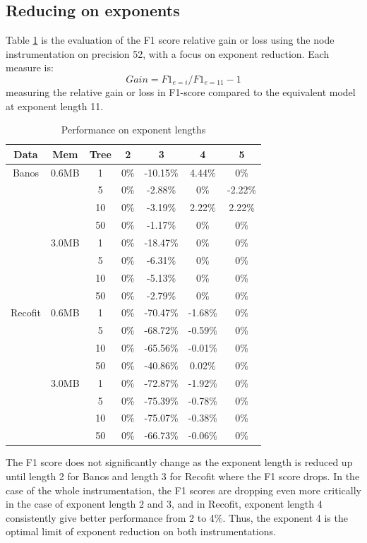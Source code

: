 \documentclass[conference]{IEEEtran}
\begin{document}
\subsection{Reducing on exponents}
Table \ref{tab3} is the evaluation of the F1 score relative gain or loss using the node instrumentation on precision 52, with a focus on exponent reduction. Each measure is:
\begin{equation}
Gain = F1_{e=i} / F1_{e=11}-1 \label{eq2}
\end{equation}
measuring the relative gain or loss in F1-score compared to the equivalent model at exponent length 11.
\begin{table}[htbp]
\caption{Performance on exponent lengths}
\begin{center}
\begin{tabular}{|c|c|c|c|c|c|c|}
\hline
\textbf{Data}&\textbf{Mem}&\textbf{Tree}&\textbf{2}&\textbf{3}&\textbf{4}&\textbf{5}\\
\hline
Banos&0.6MB&1&0\%&-10.15\%&4.44\%&0\% \\
\cline{3-7}&&5&0\%&-2.88\%&0\%&-2.22\%\\
\cline{3-7}&&10&0\%&-3.19\%&2.22\%&2.22\% \\
\cline{3-7}&&50&0\%&-1.17\%&0\%&0\% \\
\cline{2-7}&3.0MB&1&0\%&-18.47\%&0\%&0\% \\
\cline{3-7}&&5&0\%&-6.31\%&0\%&0\% \\
\cline{3-7}&&10&0\%&-5.13\%&0\%&0\% \\
\cline{3-7}&&50&0\%&-2.79\%&0\%&0\% \\
\hline
Recofit&0.6MB&1&0\%&-70.47\%&-1.68\%&0\% \\
\cline{3-7}&&5&0\%&-68.72\%&-0.59\%&0\% \\
\cline{3-7}&&10&0\%&-65.56\%&-0.01\%&0\% \\
\cline{3-7}&&50&0\%&-40.86\%&0.02\%&0\% \\
\cline{2-7}&3.0MB&1&0\%&-72.87\%&-1.92\%&0\% \\
\cline{3-7}&&5&0\%&-75.39\%&-0.78\%&0\% \\
\cline{3-7}&&10&0\%&-75.07\%&-0.38\%&0\% \\
\cline{3-7}&&50&0\%&-66.73\%&-0.06\%&0\% \\
\hline
\end{tabular}
\label{tab3}
\end{center}
\end{table}

The F1 score does not significantly change as the exponent length is reduced up until length 2 for Banos and length 3 for Recofit where the F1 score drops. In the case of the whole instrumentation, the F1 scores are dropping even more critically in the case of exponent length 2 and 3, and in Recofit, exponent length 4 consistently give better performance from 2 to 4\%. Thus, the exponent 4 is the optimal limit of exponent reduction on both instrumentations.
\end{document}
